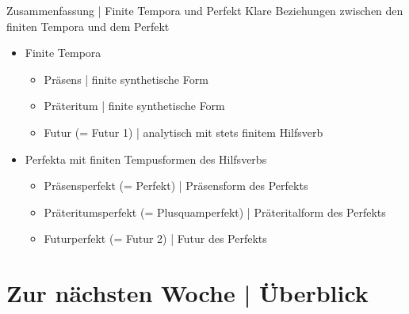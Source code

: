\begin{frame}
  {Zusammenfassung | Finite Tempora und Perfekt}
  \onslide<+->
  \onslide<+->
  Klare Beziehungen zwischen den finiten Tempora und dem Perfekt\\
  \Zeile
  \begin{itemize}[<+->]
    \item Finite Tempora
      \begin{itemize}[<+->]
        \item Präsens | finite synthetische Form
        \item Präteritum | finite synthetische Form
        \item Futur (= Futur 1) | analytisch mit stets finitem Hilfsverb
      \end{itemize}
     \Zeile 
    \item \alert{Perfekta mit finiten Tempusformen des Hilfsverbs}
      \begin{itemize}[<+->]
        \item Präsensperfekt (= Perfekt) | Präsensform des Perfekts
        \item Präteritumsperfekt (= Plusquamperfekt) | Präteritalform des Perfekts
        \item Futurperfekt (= Futur 2) | Futur des Perfekts
      \end{itemize}
  \end{itemize}
  
\end{frame}

\section{Zur nächsten Woche | Überblick}

